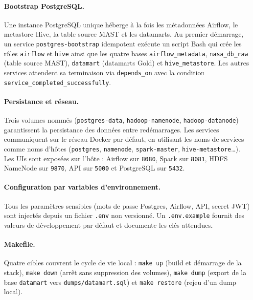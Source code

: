\documentclass[11pt,a4paper]{article}
\begin{document}
\paragraph{Bootstrap PostgreSQL.} Une instance PostgreSQL unique héberge à la fois les métadonnées Airflow, le metastore Hive, la table source MAST et les datamarts. Au premier démarrage, un service \texttt{postgres-bootstrap} idempotent exécute un script Bash qui crée les rôles \texttt{airflow} et \texttt{hive} ainsi que les quatre bases \texttt{airflow\_metadata}, \texttt{nasa\_db\_raw} (table source MAST), \texttt{datamart} (datamarts Gold) et \texttt{hive\_metastore}. Les autres services attendent sa terminaison via \texttt{depends\_on} avec la condition \texttt{service\_completed\_successfully}.

\paragraph{Persistance et réseau.} Trois volumes nommés (\texttt{postgres-data}, \texttt{hadoop-namenode}, \texttt{hadoop-datanode}) garantissent la persistance des données entre redémarrages. Les services communiquent sur le réseau Docker par défaut, en utilisant les noms de services comme noms d'hôtes (\texttt{postgres}, \texttt{namenode}, \texttt{spark-master}, \texttt{hive-metastore}\dots). Les UIs sont exposées sur l'hôte : Airflow sur \texttt{8080}, Spark sur \texttt{8081}, HDFS NameNode sur \texttt{9870}, API sur \texttt{5000} et PostgreSQL sur \texttt{5432}.

\paragraph{Configuration par variables d'environnement.} Tous les paramètres sensibles (mots de passe Postgres, Airflow, API, secret JWT) sont injectés depuis un fichier \texttt{.env} non versionné. Un \texttt{.env.example} fournit des valeurs de développement par défaut et documente les clés attendues.

\paragraph{Makefile.} Quatre cibles couvrent le cycle de vie local : \texttt{make up} (build et démarrage de la stack), \texttt{make down} (arrêt sans suppression des volumes), \texttt{make dump} (export de la base \texttt{datamart} vers \texttt{dumps/datamart.sql}) et \texttt{make restore} (rejeu d'un dump local).
\end{document}
